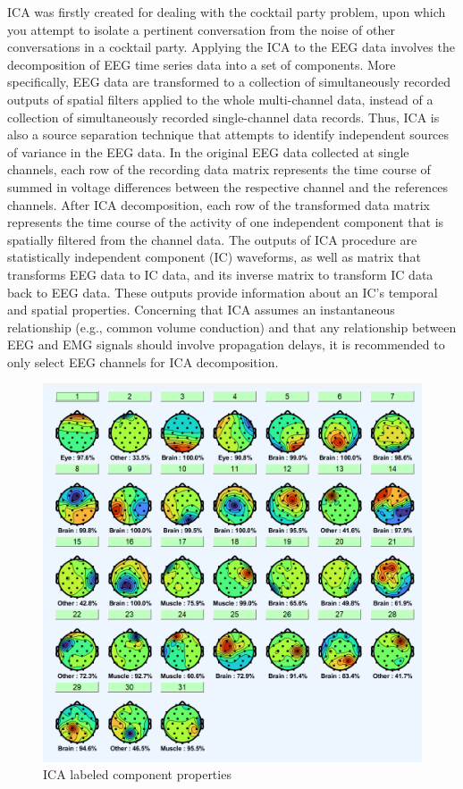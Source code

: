 \documentclass[12pt,a4paper,titlepage,openany]{report}
\begin{document}
ICA was ﬁrstly created for dealing with the cocktail party problem, upon which you attempt to isolate a pertinent conversation from the noise of other conversations in a cocktail party. Applying the ICA to the EEG data involves the decomposition of EEG time series data into a set of components. More speciﬁcally, EEG data are transformed to a collection of simultaneously recorded outputs of spatial ﬁlters applied to the whole multi-channel data, instead of a collection of simultaneously recorded single-channel data records. Thus, ICA is also a source separation technique that attempts to identify independent sources of variance in the EEG data. 
In the original EEG data collected at single channels, each row of the recording data matrix represents the time course of summed in voltage differences between the respective channel and the references channels. 
After ICA decomposition, each row of the transformed data matrix represents the time course of the activity of one independent component that is spatially ﬁltered from the channel data. 
The outputs of ICA procedure are statistically independent component (IC) waveforms, as well as matrix that transforms EEG data to IC data, and its inverse matrix to transform IC data back to EEG data. 
These outputs provide information about an IC’s temporal and spatial properties. Concerning that ICA assumes an instantaneous relationship (e.g., common volume conduction) and that any relationship between EEG and EMG signals should involve propagation delays, it is recommended to only select EEG channels for ICA decomposition\cite{makkar2023}.

\begin{figure}[H]
     \centering
     \includegraphics[width=0.8\linewidth]{./misc/Component Properties.png}
     \caption{ICA labeled component properties}
     \label{fig:component-properties-ICA}
\end{figure}
\end{document}
